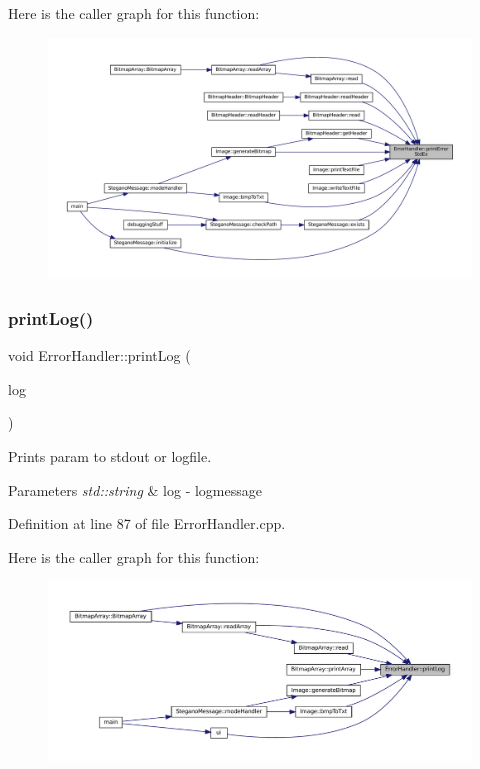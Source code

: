 Here is the caller graph for this function\+:
\nopagebreak
\begin{figure}[H]
\begin{center}
\leavevmode
\includegraphics[width=350pt]{classErrorHandler_ac36e4dd6e488718e7e07b2d03adf9f37_icgraph}
\end{center}
\end{figure}
\mbox{\label{classErrorHandler_adefe2e5f3401006300884dd85a7c88ce}} 
\subsubsection{\texorpdfstring{printLog()}{printLog()}}
{\footnotesize\ttfamily void Error\+Handler\+::print\+Log (\begin{DoxyParamCaption}\item[{std\+::string}]{log }\end{DoxyParamCaption})\hspace{0.3cm}{\ttfamily [static]}}



Prints param to stdout or logfile. 


\begin{DoxyParams}{Parameters}
{\em std\+::string} & log -\/ logmessage \\
\hline
\end{DoxyParams}


Definition at line 87 of file Error\+Handler.\+cpp.

Here is the caller graph for this function\+:
\nopagebreak
\begin{figure}[H]
\begin{center}
\leavevmode
\includegraphics[width=350pt]{classErrorHandler_adefe2e5f3401006300884dd85a7c88ce_icgraph}
\end{center}
\end{figure}


